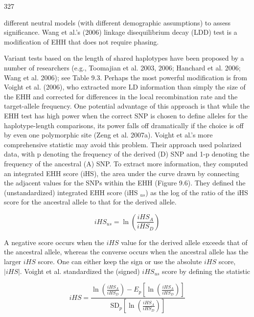 \documentclass{article}
\begin{document}
327

different neutral models (with different demographic assumptions) to assess significance. Wang et al.'s (2006) linkage disequilibrium decay (LDD) test is a modification of EHH that does not require phasing.

Variant tests based on the length of shared haplotypes have been proposed by a number of researchers (e.g., Toomajian et al. 2003, 2006; Hanchard et al. 2006; Wang et al. 2006); see Table 9.3. Perhaps the most powerful modification is from Voight et al. (2006), who extracted more LD information than simply the size of the EHH and corrected for differences in the local recombination rate and the target-allele frequency. One potential advantage of this approach is that while the EHH test has high power when the correct SNP is chosen to define alleles for the haplotype-length comparisons, its power falls off dramatically if the choice is off by even one polymorphic site (Zeng et al. 2007a). Voight et al.'s more comprehensive statistic may avoid this problem. Their approach used polarized data, with p denoting the frequency of the derived (D) SNP and 1-p denoting the frequency of the ancestral (A) SNP. To extract more information, they computed an integrated EHH score (iHS), the area under the curve drawn by connecting the adjacent values for the SNPs within the EHH (Figure 9.6). They defined the (unstandardized) integrated EHH score (iHS $ _{us} $) as the log of the ratio of the iHS score for the ancestral allele to that for the derived allele.

\begin{equation}
iHS_{us}=\ln\left(\frac{iHS_{A}}{iHS_{D}}\right)
\tag{9.41a}
\label{eq:9_41a}
\end{equation}

A negative score occurs when the  $ iHS $ value for the derived allele exceeds that of the ancestral allele, whereas the converse occurs when the ancestral allele has the larger  $ iHS $ score. One can either keep the sign or use the absolute  $ iHS $ score,  $ |iHS| $. Voight et al. standardized the (signed)  $ iHS_{us} $ score by defining the statistic

\begin{equation}
iHS=\frac{\ln\left(\frac{iHS_{A}}{iHS_{D}}\right)-E_{p}\left[\ln\left(\frac{iHS_{A}}{iHS_{D}}\right)\right]}{\mathrm{SD}_{p}\left[\ln\left(\frac{iHS_{A}}{iHS_{D}}\right)\right]}
\tag{9.41b}
\label{eq:9_41b}
\end{equation}
\end{document}

